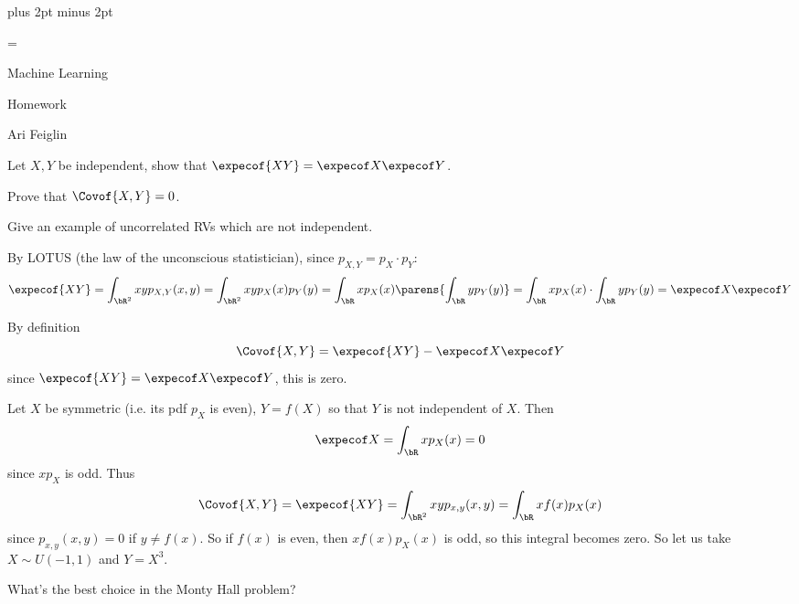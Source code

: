 

\parindent=0pt
\parskip=3pt plus 2pt minus 2pt



\footline={}

\setcounter{section}{1}


\def\printmcount{\the\counter{section}.\the\counter{math counter}}

{

    \centerline{Machine Learning}
    \smallskip
    \centerline{Homework \the{}}
    \centerline{Ari Feiglin}

\eppbox}

\bexerc

    \benum
        \item Let $X,Y$ be independent, show that $\expecof{XY}=\expecof X\expecof Y$.
        \item Prove that $\Covof{X,Y}=0$.
        \item Give an example of uncorrelated RVs which are not independent.
    \eenum

\eexerc

\benum
    \item By LOTUS (the law of the unconscious statistician), since $p_{X,Y}=p_X\cdot p_Y$:
    $$ \expecof{XY} = \int_{\bR^2}xyp_{X,Y}(x,y) = \int_{\bR^2}xyp_X(x)p_Y(y) = \int_{\bR}xp_X(x)\parens{\int_{\bR}yp_Y(y)} = \int_{\bR}xp_X(x)\cdot\int_{\bR}yp_Y(y) = \expecof X\expecof Y $$
    \item By definition
    $$ \Covof{X,Y} = \expecof{XY} - \expecof X\expecof Y $$
    since $\expecof{XY} = \expecof X\expecof Y$, this is zero.
    \item Let $X$ be symmetric (i.e. its pdf $p_X$ is even), $Y=f(X)$ so that $Y$ is not independent of $X$.
    Then
    $$ \expecof X = \int_{\bR} xp_X(x) = 0 $$
    since $xp_X$ is odd.
    Thus
    $$ \Covof{X,Y}=\expecof{XY} = \int_{\bR^2}xyp_{x,y}(x,y) = \int_\bR xf(x)p_X(x) $$
    since $p_{x,y}(x,y)=0$ if $y\neq f(x)$.
    So if $f(x)$ is even, then $xf(x)p_X(x)$ is odd, so this integral becomes zero.
    So let us take $X\sim U(-1,1)$ and $Y=X^3$.
\eenum

\bexerc

    What's the best choice in the Monty Hall problem?

